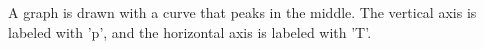 A graph is drawn with a curve that peaks in the middle. The vertical axis is labeled with 'p', and the horizontal axis is labeled with 'T'.